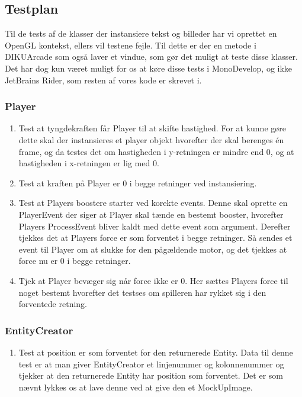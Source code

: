 \subsection{Testplan}
   Til de tests af de klasser der instansiere tekst og billeder har vi oprettet en OpenGL kontekst, ellers vil testene fejle. Til dette er der en metode i DIKU\-Arcade som også laver et vindue, som gør det muligt at teste disse klasser. Det har dog kun været muligt for os at køre disse tests i MonoDevelop, og ikke JetBrains Rider, som resten af vores kode er skrevet i.
   \subsubsection{Player}
      \begin{enumerate}
         \item Test at tyngdekraften får Player til at skifte hastighed. For at kunne gøre dette skal der instansieres et player objekt hvorefter der skal berenges én frame, og da testes det om hastigheden i y-retningen er mindre end 0, og at hastigheden i x-retningen er lig med 0.
         \item Test at kraften på Player er 0 i begge retninger ved instansiering. 
         \item Test at Players boostere starter ved korekte events. Denne skal oprette en PlayerEvent der siger at Player skal tænde en bestemt booster, hvorefter Players ProcessEvent bliver kaldt med dette event som argument. Derefter tjekkes det at Players force er som forventet i begge retninger. Så sendes et event til Player om at slukke for den pågældende motor, og det tjekkes at force nu er 0 i begge retninger.
         \item Tjek at Player bevæger sig når force ikke er 0. Her sættes Players force til noget bestemt hvorefter det testses om spilleren har rykket sig i den forventede retning. 
      \end{enumerate}
   \subsubsection{EntityCreator}
      \begin{enumerate}
         \item Test at position er som forventet for den returnerede Entity. Data til denne test er at man giver EntityCreator et linjenummer og kolonnenummer og tjekker at den returnerede Entity har position som forventet. Det er som nævnt lykkes os at lave denne ved at give den et MockUpImage. 
      \end{enumerate}
